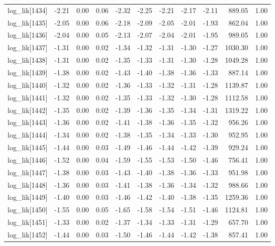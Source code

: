\begin{table}[ht]
\begin{tabular}{rrrrrrrrrrr}
  log\_lik[1434] & -2.21 & 0.00 & 0.06 & -2.32 & -2.25 & -2.21 & -2.17 & -2.11 & 889.05 & 1.00 \\ 
  log\_lik[1435] & -2.05 & 0.00 & 0.06 & -2.18 & -2.09 & -2.05 & -2.01 & -1.93 & 862.04 & 1.00 \\ 
  log\_lik[1436] & -2.04 & 0.00 & 0.05 & -2.13 & -2.07 & -2.04 & -2.01 & -1.95 & 989.05 & 1.00 \\ 
  log\_lik[1437] & -1.31 & 0.00 & 0.02 & -1.34 & -1.32 & -1.31 & -1.30 & -1.27 & 1030.30 & 1.00 \\ 
  log\_lik[1438] & -1.31 & 0.00 & 0.02 & -1.35 & -1.33 & -1.31 & -1.30 & -1.28 & 1049.28 & 1.00 \\ 
  log\_lik[1439] & -1.38 & 0.00 & 0.02 & -1.43 & -1.40 & -1.38 & -1.36 & -1.33 & 887.14 & 1.00 \\ 
  log\_lik[1440] & -1.32 & 0.00 & 0.02 & -1.36 & -1.33 & -1.32 & -1.31 & -1.28 & 1139.87 & 1.00 \\ 
  log\_lik[1441] & -1.32 & 0.00 & 0.02 & -1.35 & -1.33 & -1.32 & -1.30 & -1.28 & 1112.58 & 1.00 \\ 
  log\_lik[1442] & -1.35 & 0.00 & 0.02 & -1.39 & -1.36 & -1.35 & -1.34 & -1.31 & 1319.22 & 1.00 \\ 
  log\_lik[1443] & -1.36 & 0.00 & 0.02 & -1.41 & -1.38 & -1.36 & -1.35 & -1.32 & 956.26 & 1.00 \\ 
  log\_lik[1444] & -1.34 & 0.00 & 0.02 & -1.38 & -1.35 & -1.34 & -1.33 & -1.30 & 952.95 & 1.00 \\ 
  log\_lik[1445] & -1.44 & 0.00 & 0.03 & -1.49 & -1.46 & -1.44 & -1.42 & -1.39 & 929.24 & 1.00 \\ 
  log\_lik[1446] & -1.52 & 0.00 & 0.04 & -1.59 & -1.55 & -1.53 & -1.50 & -1.46 & 756.41 & 1.00 \\ 
  log\_lik[1447] & -1.38 & 0.00 & 0.03 & -1.43 & -1.40 & -1.38 & -1.36 & -1.33 & 951.98 & 1.00 \\ 
  log\_lik[1448] & -1.36 & 0.00 & 0.03 & -1.41 & -1.38 & -1.36 & -1.34 & -1.32 & 988.66 & 1.00 \\ 
  log\_lik[1449] & -1.40 & 0.00 & 0.03 & -1.46 & -1.42 & -1.40 & -1.38 & -1.35 & 1259.36 & 1.00 \\ 
  log\_lik[1450] & -1.55 & 0.00 & 0.05 & -1.65 & -1.58 & -1.54 & -1.51 & -1.46 & 1124.81 & 1.00 \\ 
  log\_lik[1451] & -1.33 & 0.00 & 0.02 & -1.37 & -1.34 & -1.33 & -1.31 & -1.29 & 657.70 & 1.00 \\ 
  log\_lik[1452] & -1.44 & 0.00 & 0.03 & -1.50 & -1.46 & -1.44 & -1.42 & -1.38 & 857.41 & 1.00 \\ 

\end{tabular}
\end{table}
